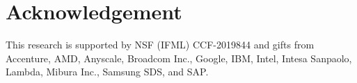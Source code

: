 \section*{Acknowledgement}

This research is supported by NSF (IFML) CCF-2019844 and gifts from Accenture, AMD, Anyscale, Broadcom Inc., Google, IBM, Intel, Intesa Sanpaolo, Lambda, Mibura Inc., Samsung SDS, and SAP.